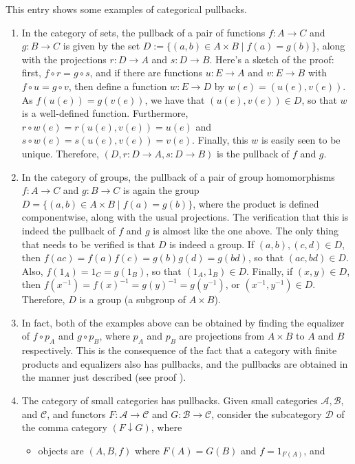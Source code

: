 \documentclass[12pt]{article}
\begin{document}
This entry shows some examples of categorical pullbacks.

\begin{enumerate}
\item In the category of sets, the pullback of a pair of functions $f:A\to C$ and $g:B\to C$ is given by the set $D:= \lbrace (a,b)\in A\times B \mid f(a)=g(b)\rbrace$, along with the projections $r:D\to A$ and $s:D\to B$.  Here's a sketch of the proof: first, $f\circ r=g\circ s$, and if there are functions $u:E\to A$ and $v:E\to B$ with $f\circ u=g\circ v$, then define a function $w:E\to D$ by $w(e)=(u(e),v(e))$.  As $f(u(e))=g(v(e))$, we have that $(u(e),v(e))\in D$, so that $w$ is a well-defined function.  Furthermore, $r\circ w(e)=r(u(e),v(e))=u(e)$ and $s\circ w(e)=s(u(e),v(e))=v(e)$.  Finally, this $w$ is easily seen to be unique.  Therefore, $(D,r:D\to A, s:D\to B)$ is the pullback of $f$ and $g$.
\item In the category of groups, the pullback of a pair of group homomorphisms $f:A\to C$ and $g:B\to C$ is again the group $D=\lbrace (a,b)\in A\times B \mid f(a)=g(b)\rbrace$, where the product is defined componentwise, along with the usual projections.  The verification that this is indeed the pullback of $f$ and $g$ is almost like the one above.  The only thing that needs to be verified is that $D$ is indeed a group.  If $(a,b),(c,d)\in D$, then $f(ac)=f(a)f(c)=g(b)g(d) = g(bd)$, so that $(ac,bd)\in D$.  Also, $f(1_A)=1_C=g(1_B)$, so that $(1_A,1_B)\in D$.  Finally, if $(x,y)\in D$, then $f(x^{-1})=f(x)^{-1}=g(y)^{-1}=g(y^{-1})$, or $(x^{-1},y^{-1})\in D$.  Therefore, $D$ is a group (a subgroup of $A\times B$).
\item In fact, both of the examples above can be obtained by finding the equalizer of $f\circ p_A$ and $g\circ p_B$, where $p_A$ and $p_B$ are projections from $A\times B$ to $A$ and $B$ respectively.  This is the consequence of the fact that a category with finite products and equalizers also has pullbacks, and the pullbacks are obtained in the manner just described (see proof ).
\item The category of small categories has pullbacks.  Given small categories $\mathcal{A}, \mathcal{B}$, and $\mathcal{C}$, and functors $F:\mathcal{A}\to \mathcal{C}$ and $G:\mathcal{B}\to \mathcal{C}$, consider the subcategory $\mathcal{D}$ of the comma category $(F\downarrow G)$, where 
\begin{itemize}
\item objects are $(A,B,f)$ where $F(A)=G(B)$ and $f=1_{F(A)}$, and 

\end{itemize}
\end{enumerate}
\end{document}
